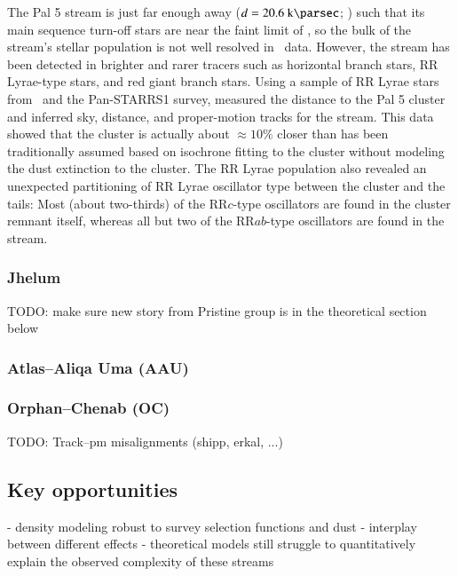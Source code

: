 \documentclass[final,5p,times,twocolumn,authoryear]{elsarticle}
\begin{document}
The Pal 5 stream is just far enough away ($d = 20.6~\kpc$; \citealt{price-whelan:2019})
such that its main sequence turn-off stars are near the faint limit of \gaia, so the
bulk of the stream's stellar population is not well resolved in \gaia\ data.
However, the stream has been detected in brighter and rarer tracers such as horizontal
branch stars, RR Lyrae-type stars, and red giant branch stars.
Using a sample of RR Lyrae stars from \gaia\ and the Pan-STARRS1 survey,
\citet{price-whelan:2019} measured the distance to the Pal 5 cluster and inferred sky,
distance, and proper-motion tracks for the stream.
This data showed that the cluster is actually about $\approx 10\%$ closer than has been
traditionally assumed based on isochrone fitting to the cluster without modeling the
dust extinction to the cluster.
The RR Lyrae population also revealed an unexpected partitioning of RR Lyrae oscillator
type between the cluster and the tails:
Most (about two-thirds) of the RR$c$-type oscillators are found in the cluster remnant
itself, whereas all but two of the RR$ab$-type oscillators are found in the stream.


\subsubsection{Jhelum}
\label{sec:jhelum}

TODO: make sure new story from Pristine group is in the theoretical section below


\subsubsection{Atlas--Aliqa Uma (AAU)}
\label{sec:aau}


\subsubsection{Orphan--Chenab (OC)}
\label{sec:oc}

TODO: Track--pm misalignments (shipp, erkal, ...)

\citep{belokurov:2006-orphan, grillmair:2006-orphan, belokurov:2007}


\subsection{Key opportunities}
- density modeling robust to survey selection functions and dust \citep{patrick:2022}
- interplay between different effects
- theoretical models still struggle to quantitatively explain the observed complexity of these streams
\end{document}
